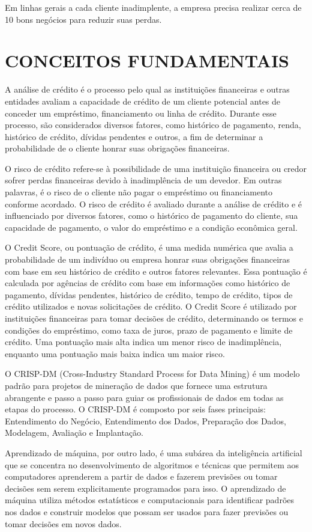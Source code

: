 \documentclass[12pt,a4paper]{article}
\begin{document}
Em linhas gerais a cada cliente inadimplente, a empresa precisa realizar cerca de 10 bons negócios para reduzir suas perdas.
\section{CONCEITOS FUNDAMENTAIS}
A análise de crédito é o processo pelo qual as instituições financeiras e outras entidades avaliam a capacidade de crédito de um cliente potencial antes de conceder um empréstimo, financiamento ou linha de crédito. Durante esse processo, são considerados diversos fatores, como histórico de pagamento, renda, histórico de crédito, dívidas pendentes e outros, a fim de determinar a probabilidade de o cliente honrar suas obrigações financeiras.

O risco de crédito refere-se à possibilidade de uma instituição financeira ou credor sofrer perdas financeiras devido à inadimplência de um devedor. Em outras palavras, é o risco de o cliente não pagar o empréstimo ou financiamento conforme acordado. O risco de crédito é avaliado durante a análise de crédito e é influenciado por diversos fatores, como o histórico de pagamento do cliente, sua capacidade de pagamento, o valor do empréstimo e a condição econômica geral.

O Credit Score, ou pontuação de crédito, é uma medida numérica que avalia a probabilidade de um indivíduo ou empresa honrar suas obrigações financeiras com base em seu histórico de crédito e outros fatores relevantes. Essa pontuação é calculada por agências de crédito com base em informações como histórico de pagamento, dívidas pendentes, histórico de crédito, tempo de crédito, tipos de crédito utilizados e novas solicitações de crédito. O Credit Score é utilizado por instituições financeiras para tomar decisões de crédito, determinando os termos e condições do empréstimo, como taxa de juros, prazo de pagamento e limite de crédito. Uma pontuação mais alta indica um menor risco de inadimplência, enquanto uma pontuação mais baixa indica um maior risco.

O CRISP-DM (Cross-Industry Standard Process for Data Mining) é um modelo padrão para projetos de mineração de dados que fornece uma estrutura abrangente e passo a passo para guiar os profissionais de dados em todas as etapas do processo. O CRISP-DM é composto por seis fases principais: Entendimento do Negócio, Entendimento dos Dados, Preparação dos Dados, Modelagem, Avaliação e Implantação.

Aprendizado de máquina, por outro lado, é uma subárea da inteligência artificial que se concentra no desenvolvimento de algoritmos e técnicas que permitem aos computadores aprenderem a partir de dados e fazerem previsões ou tomar decisões sem serem explicitamente programados para isso. O aprendizado de máquina utiliza métodos estatísticos e computacionais para identificar padrões nos dados e construir modelos que possam ser usados para fazer previsões ou tomar decisões em novos dados.
\end{document}
